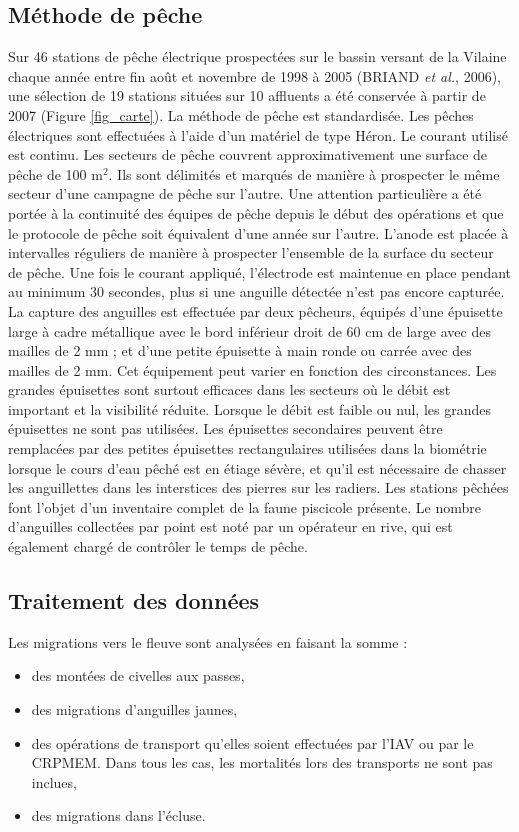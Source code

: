 \documentclass[10pt,twocolumn,titlepage,twoside]{article}\usepackage[]{graphicx}\usepackage[]{color}
\begin{document}
\subsection{Méthode de pêche}

Sur 46 stations de pêche électrique
prospectées sur le bassin versant de la Vilaine chaque année entre
fin août et novembre de 1998 à 2005
(BRIAND \textit{ et
al.}, 2006), une sélection de 19 stations
situées sur 10 affluents a été conservée à partir de 2007
(Figure \ref{fig_carte}). La
méthode de pêche est standardisée. Les pêches électriques
sont effectuées à l'aide d'un
matériel de type Héron. Le courant utilisé est continu. Les secteurs de pêche
couvrent approximativement une surface de pêche de 100 m$^2$.
Ils sont délimités et marqués de manière à prospecter le
même secteur d'une campagne de pêche sur
l'autre. Une attention particulière a été portée à la continuité des
équipes de pêche depuis le début des opérations et que le protocole de pêche
soit équivalent d'une année sur l'autre.
L'anode est placée à intervalles réguliers de
manière à prospecter l'ensemble de la surface du
secteur de pêche. Une fois le courant appliqué,
l'électrode est maintenue en place pendant au minimum
30 secondes, plus si une anguille détectée n'est
pas encore capturée. La capture des anguilles est effectuée par
deux pêcheurs, équipés d'une épuisette large
à cadre métallique avec le bord inférieur droit de 60 cm de large
avec des mailles de 2 mm ; et d'une petite épuisette
à main ronde ou carrée avec des mailles de 2 mm. Cet équipement
peut varier en fonction des circonstances. Les grandes épuisettes
sont surtout efficaces dans les secteurs où le débit est important
et la visibilité réduite. Lorsque le débit est faible ou nul, les
grandes épuisettes ne sont pas utilisées. Les épuisettes
secondaires peuvent être remplacées par des petites épuisettes
rectangulaires utilisées dans la biométrie lorsque le cours
d'eau pêché est en étiage sévère, et
qu'il est nécessaire de
 \og chasser \fg les anguillettes dans les
interstices des pierres sur les radiers. Les stations pêchées font
l'objet d'un inventaire complet de la
faune piscicole présente. Le nombre d'anguilles
collectées par point est noté par un opérateur en rive, qui est
également chargé de contrôler le temps de pêche.

\subsection{Traitement des données}
Les migrations vers le fleuve sont analysées en faisant la somme :
\begin{itemize}
\item des montées de civelles aux passes,
\item des migrations d'anguilles jaunes,
\item des opérations de transport qu'elles soient effectuées par l'IAV ou par le
CRPMEM. Dans tous les cas, les mortalités lors des transports ne sont pas
inclues,
\item des migrations dans l'écluse.
\end{itemize}
\end{document}
